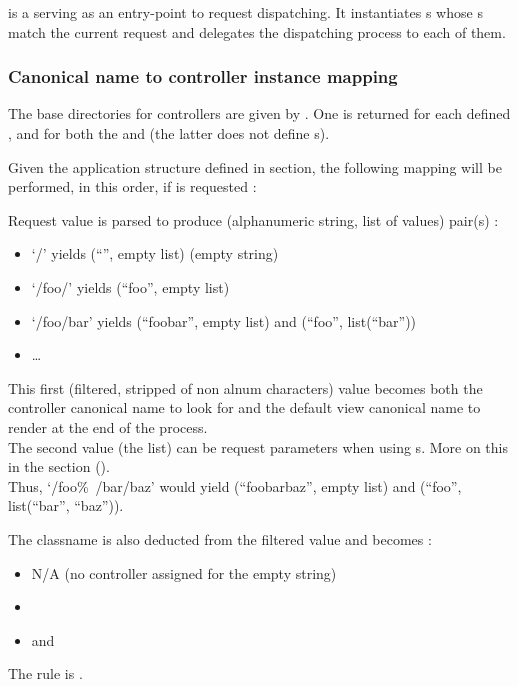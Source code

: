 \documentclass[pdftex,12pt,a4paper]{article}
\begin{document}
 is a  serving as an entry-point to request dispatching. It instantiates s whose s match the current request and delegates the dispatching process to each of them.

\subsubsection{Canonical name to controller instance mapping} \label{sec:canonical-name-to-controller-instance-mapping}

The base directories for controllers are given by . One is returned for each defined , and for both the  and  (the latter does not define s).

Given the application structure defined in  section, the following mapping will be performed, in this order, if  is requested :

Request value is parsed to produce (alphanumeric string, list of values) pair(s) :
\begin{itemize}
	\item `/' yields (``'', empty list) (\ie empty string)
	\item `/foo/' yields (``foo'', empty list)
	\item `/foo/bar' yields (``foobar'', empty list) and (``foo'', list(``bar''))
	\item \ldots
\end{itemize}

\begin{note}
	This first (filtered, stripped of non alnum characters) value becomes both the controller canonical name to look for and the default view canonical name to render at the end of the process. \\
	The second value (the list) can be request parameters when using s. More on this in the section (). \\
	Thus, `/foo\%~/bar/baz' would yield (``foobarbaz'', empty list) and (``foo'', list(``bar'', ``baz'')).
\end{note}

The  classname is also deducted from the filtered value and becomes :
\begin{itemize}
	\item N/A (no controller assigned for the empty string)
	\item {}
	\item {} and 
\end{itemize}
The rule is .
\end{document}
